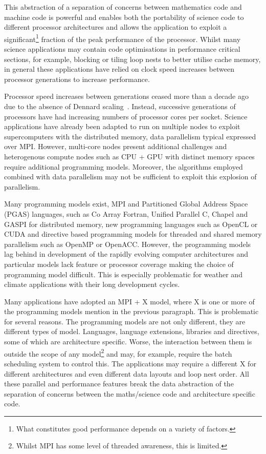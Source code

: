 \documentclass[times]{elsarticle}
\begin{document}
This abstraction of a separation of concerns between mathematics code
and machine code is powerful and enables both the portability of
science code to different processor architectures and allows the
application to exploit a significant\footnote{What constitutes good
  performance depends on a variety of factors.} fraction of the peak
performance of the processor. Whilst many science applications may
contain code optimisations in performance critical sections, for
example, blocking or tiling loop nests to better utilise cache memory,
in general these applications have relied on clock
speed increases between processor generations to increase performance.

Processor speed increases between generations ceased more than a decade
ago due to the absence of Dennard scaling~\cite{dennard}. Instead,
successive generations of processors have had increasing numbers of processor cores per
socket. Science applications have already been adapted to run on multiple
nodes to exploit supercomputers with the distributed memory, data parallelism
typical expressed over MPI. However, multi-core nodes present
additional challenges and heterogenous compute nodes such as
CPU + GPU with distinct memory spaces require additional programming
models. Moreover, the algorithms employed combined with data
parallelism may not be sufficient to exploit this explosion of parallelism.

Many programming models exist, MPI and Partitioned Global Address
Space (PGAS) languages, such as Co Array Fortran, Unified Parallel C,
Chapel and GASPI for distributed memory, new programming languages such
as OpenCL or CUDA and directive based programming models for threaded
and shared memory parallelism such as OpenMP or OpenACC. However,
the programming models lag behind in development of the rapidly evolving computer
architectures and particular models lack feature or processor coverage
making the choice of programming model difficult. This is especially
problematic for weather and climate applications with their long development
cycles. 

Many applications have adopted an MPI + X model, where X is one or
more of the programming models mention in the previous paragraph. This
is problematic for several reasons. The programming models are not
only different, they are different types of model. Languages, language
extensions, libraries and directives, some of which are architecture
specific. Worse, the interaction between them is outside the scope of
any model\footnote{Whilst MPI has some level of threaded awareness,
  this is limited.} and may, for example, require the batch scheduling
system to control this. The applications may require a different X for
different architectures and even different data layouts and
loop nest order. All these parallel and performance features
break the data abstraction of the separation of concerns between the
maths/science code and architecture specific code.
\end{document}
